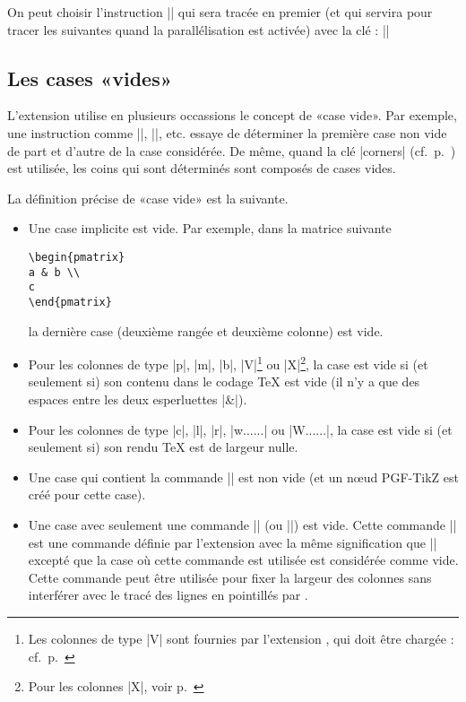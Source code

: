 \documentclass[dvipsnames]{article}%
\begin{document}
\medskip
{}
On peut choisir l'instruction |\Ddots| qui sera tracée en premier (et qui
servira pour tracer les suivantes quand la parallélisation est activée) avec la
clé  : ||

\subsection{Les cases «vides»}

\label{empty-cells}

L'extension  utilise en plusieurs occassions le concept de «case
vide». Par exemple, une instruction comme |\Ldots|, |\Cdots|, etc. essaye de
déterminer la première case non vide de part et d'autre de la case considérée.
De même, quand la clé |corners| (cf.~p.~\pageref{corners}) est utilisée, les
coins qui sont déterminés sont composés de cases vides. 

La définition précise de «case vide» est la suivante.

\begin{itemize}
\item Une case implicite est vide. Par exemple, dans la matrice suivante

\begin{Verbatim}
\begin{pmatrix}
a & b \\
c
\end{pmatrix}
\end{Verbatim}

la dernière case (deuxième rangée et deuxième colonne) est vide.

\medskip
\item Pour les colonnes de type |p|, |m|, |b|, |V|\footnote{Les colonnes de type
  |V| sont fournies par l'extension , qui doit être chargée : cf.~p.~\pageref{varwidth}}
ou |X|\footnote{Pour les colonnes |X|, voir p.~\pageref{colonne-X}}, la case est vide si (et seulement
si) son contenu dans le codage TeX est vide (il n'y a que des espaces entre les
deux esperluettes |&|).

\medskip
\item Pour les colonnes de type |c|, |l|, |r|, |w{...}{...}| ou |W{...}{...}|,
la case est vide si (et seulement si) son rendu TeX est de largeur nulle.

\medskip
\item Une case qui contient la commande |\NotEmpty| est non vide (et un nœud
PGF-TikZ est créé pour cette case).

\medskip
\item Une case avec seulement une commande |\Hspace| (ou |\Hspace*|) est vide.
Cette commande |\Hspace| est une commande définie par l'extension
 avec la même signification que |\hspace| excepté que la case où
cette commande est utilisée est considérée comme vide. Cette commande peut être
utilisée pour fixer la largeur des colonnes sans interférer avec le tracé des
lignes en pointillés par .
\end{itemize}
\end{document}
